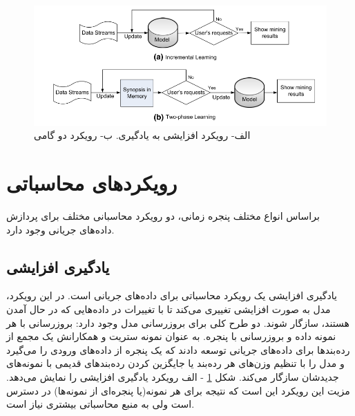 \begin{figure}%
\centerline{\includegraphics[width=15cm]{approach}}
\caption{الف- رویکرد افزایشی به یادگیری. ب- رویکرد دو گامی}
\label{fig:approach}
\end{figure}


\section{رویکردهای محاسباتی}

براساس انواع مختلف پنجره زمانی، دو رویکرد محاسبانی مختلف برای پردازش داده‌های جریانی وجود دارد.

\subsection{یادگیری افزایشی}
یادگیری افزایشی یک رویکرد محاسباتی برای داده‌های جریانی است\cite{seidl2009indexing}. در این رویکرد، مدل به صورت افزایشی تغییری می‌کند تا با تغییرات در داده‌هایی که در حال آمدن هستند، سازگار شوند. دو طرح کلی برای بروزرسانی مدل وجود دارد: بروزرسانی با هر نمونه داده و بروزرسانی با پنجره. به عنوان نمونه ستریت
و همکارانش \cite{seidl2009indexing}یک مجمع از رده‌بندها برای داده‌های جریانی توسعه‌ دادند که یک پنجره از داده‌های ورودی را می‌گیرد و مدل را با تنظیم وزن‌های هر رده‌بند یا جایگزین کردن رده‌بند‌های قدیمی با نمونه‌های جدیدشان سازگار می‌کند. شکل
\ref{fig:approach}
- الف رویکرد یادگیری افزایشی را نمایش می‌دهد. مزیت این رویکرد این است که نتیجه برای هر نمونه(یا پنجره‌ای از نمونه‌ها) در دسترس است ولی به منبع محاسباتی بیشتری نیاز است.
